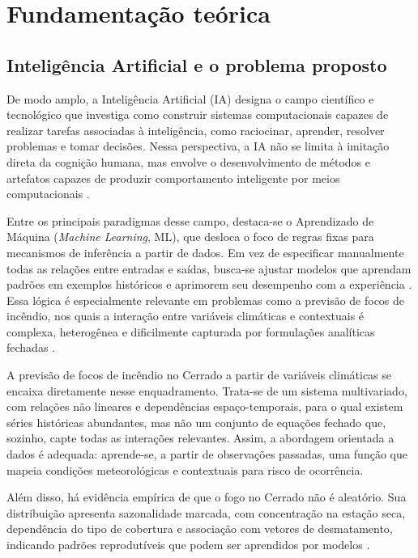 
\chapter{Fundamentação teórica}
\label{cap:fundamentacao}

\section{Inteligência Artificial e o problema proposto}
\label{sec:ia-e-ml}

De modo amplo, a Inteligência Artificial (IA) designa o campo científico e tecnológico que investiga como construir sistemas computacionais capazes de realizar tarefas associadas à inteligência, como raciocinar, aprender, resolver problemas e tomar decisões. Nessa perspectiva, a IA não se limita à imitação direta da cognição humana, mas envolve o desenvolvimento de métodos e artefatos capazes de produzir comportamento inteligente por meios computacionais \cite{mccarthy2007what,russell2021artificial}.

Entre os principais paradigmas desse campo, destaca-se o Aprendizado de Máquina (\textit{Machine Learning}, ML), que desloca o foco de regras fixas para mecanismos de inferência a partir de dados. Em vez de especificar manualmente todas as relações entre entradas e saídas, busca-se ajustar modelos que aprendam padrões em exemplos históricos e aprimorem seu desempenho com a experiência \cite{mitchell1997machine}. Essa lógica é especialmente relevante em problemas como a previsão de focos de incêndio, nos quais a interação entre variáveis climáticas e contextuais é complexa, heterogênea e dificilmente capturada por formulações analíticas fechadas \cite{andrianarivony2024review}.

A previsão de focos de incêndio no Cerrado a partir de variáveis climáticas se encaixa diretamente nesse enquadramento. Trata-se de um sistema multivariado, com relações não lineares e dependências espaço-temporais, para o qual existem séries históricas abundantes, mas não um conjunto de equações fechado que, sozinho, capte todas as interações relevantes. Assim, a abordagem orientada a dados é adequada: aprende-se, a partir de observações passadas, uma função que mapeia condições meteorológicas e contextuais para risco de ocorrência.

Além disso, há evidência empírica de que o fogo no Cerrado não é aleatório. Sua distribuição apresenta sazonalidade marcada, com concentração na estação seca, dependência do tipo de cobertura e associação com vetores de desmatamento, indicando padrões reprodutíveis que podem ser aprendidos por modelos \cite{nascimento2011analise}.

